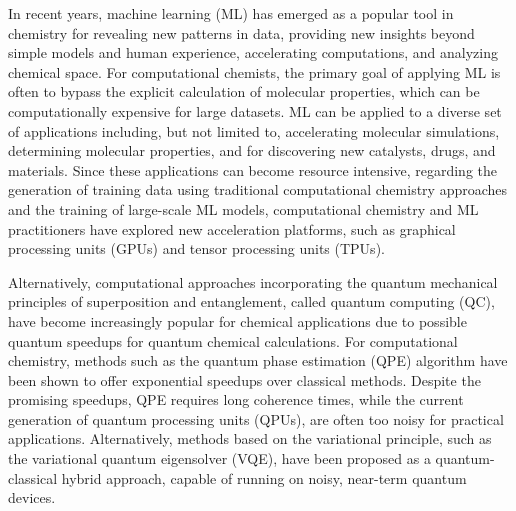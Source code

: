 \documentclass[journal=jacsat,manuscript=article]{achemso}
\begin{document}
In recent years, machine learning (ML) has emerged as a popular tool in chemistry for revealing new patterns in data, providing new insights beyond simple models and human experience, accelerating computations, and analyzing chemical space.
For computational chemists, the primary goal of applying ML is often to bypass the explicit calculation of molecular properties, which can be computationally expensive for large datasets.\cite{janet_machine_2020}
ML can be applied to a diverse set of applications including, but not limited to, accelerating molecular simulations\cite{behler_perspective_2016,ssmith_ani-1_2017,gao_torchani_2020}, determining molecular properties\cite{yang_analyzing_2019,ramakrishnan_quantum_2014,ramakrishnan_big_2015,hansen_machine_2015,unke_physnet_2019}, and for discovering new catalysts\cite{zhong_accelerated_2020,nandy_computational_2021,mjones_data-driven_2023}, drugs\cite{goh_deep_2017,yang_concepts_2019}, and materials.\cite{butler_machine_2018,sanchez-lengeling_inverse_2018,raccuglia_machine-learning-assisted_2016}
Since these applications can become resource intensive, regarding the generation of training data using traditional computational chemistry approaches and the training of large-scale ML models, computational chemistry and ML practitioners have explored new acceleration platforms, such as graphical processing units (GPUs) and tensor processing units (TPUs).\cite{ufimtsev_graphical_2008,gotz_chapter_2010,pederson_large_2023,goh_deep_2017,gawehn_advancing_2018,pandey_transformational_2022,ssmith_ani-1_2017}

Alternatively, computational approaches incorporating the quantum mechanical principles of superposition and entanglement, called quantum computing (QC), have become increasingly popular for chemical applications due to possible quantum speedups for quantum chemical calculations.\cite{cao_quantum_2019}
For computational chemistry, methods such as the quantum phase estimation (QPE)\cite{abrams_simulation_1997,abrams_quantum_1999,aspuru-guzik_simulated_2005,lanyon_towards_2010,whitfield_simulation_2011,aspuru-guzik_photonic_2012} algorithm have been shown to offer exponential speedups over classical methods.
Despite the promising speedups, QPE requires long coherence times, while the current generation of quantum processing units (QPUs), are often too noisy for practical applications.
Alternatively, methods based on the variational principle, such as the variational quantum eigensolver (VQE)\cite{peruzzo_variational_2014,cerezo_variational_2021,mcclean_theory_2016,bharti_noisy_2022}, have been proposed as a quantum-classical hybrid approach, capable of running on noisy, near-term quantum devices.
\end{document}

